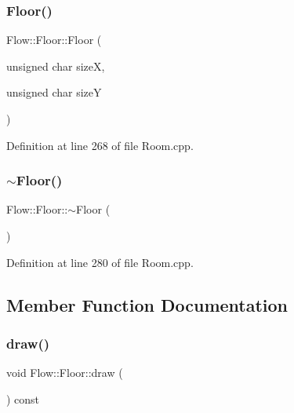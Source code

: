 \subsubsection{\texorpdfstring{Floor()}{Floor()}\hspace{0.1cm}{\footnotesize\ttfamily [3/3]}}
{\footnotesize\ttfamily Flow\+::\+Floor\+::\+Floor (\begin{DoxyParamCaption}\item[{unsigned char}]{sizeX,  }\item[{unsigned char}]{sizeY }\end{DoxyParamCaption})}



Definition at line 268 of file Room.\+cpp.

\hypertarget{class_flow_1_1_floor_abcb53e88835e043390289c0aac035ac0}{}\label{class_flow_1_1_floor_abcb53e88835e043390289c0aac035ac0} 
\subsubsection{\texorpdfstring{$\sim$\+Floor()}{~Floor()}}
{\footnotesize\ttfamily Flow\+::\+Floor\+::$\sim$\+Floor (\begin{DoxyParamCaption}{ }\end{DoxyParamCaption})}



Definition at line 280 of file Room.\+cpp.



\subsection{Member Function Documentation}
\hypertarget{class_flow_1_1_floor_a8b0f7d881353b347f54c656189643b51}{}\label{class_flow_1_1_floor_a8b0f7d881353b347f54c656189643b51} 
\subsubsection{\texorpdfstring{draw()}{draw()}}
{\footnotesize\ttfamily void Flow\+::\+Floor\+::draw (\begin{DoxyParamCaption}{ }\end{DoxyParamCaption}) const}



